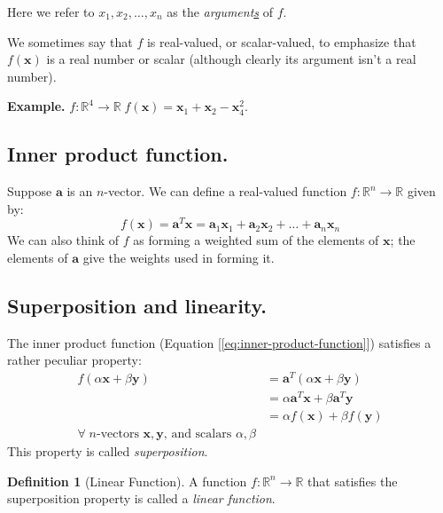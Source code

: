 \documentclass[11pt]{book}
\theoremstyle{definition}
\newtheorem{definition}{Definition}
\theoremstyle{plain}
\theoremstyle{problemstyle}
\theoremstyle{remark}
\theoremstyle{definition}
\begin{document}
Here we refer to $x_1,x_2,\dots,x_n$ as the \emph{argument\underline{s}} of $f$. 

We sometimes say that $f$ is real-valued, or scalar-valued, to emphasize that $f(\boldsymbol{x})$ is a real number or scalar (although clearly its argument isn't a real number).

\textbf{Example.} $f:\mathbb{R}^4\rightarrow\mathbb{R}\;f(\boldsymbol{x})=\boldsymbol{x}_1+\boldsymbol{x}_2-\boldsymbol{x}_4^2$.

\subsection*{Inner product function.}
Suppose $\boldsymbol{a}$ is an $n$-vector. We can define a real-valued function $f:\mathbb{R}^n\rightarrow\mathbb{R}$ given by: 
\begin{equation}
    \label{eq:inner-product-function}
    f(\boldsymbol{x})=\boldsymbol{a}^T\boldsymbol{x}=\boldsymbol{a}_1\boldsymbol{x}_1+\boldsymbol{a}_2\boldsymbol{x}_2+\dots+\boldsymbol{a}_n\boldsymbol{x}_n
\end{equation}
We can also think of $f$ as forming a weighted sum of the elements of $\boldsymbol{x}$; the elements of $\boldsymbol{a}$ give the weights used in forming it.
\subsection*{Superposition and linearity.}
The inner product function (Equation [\ref{eq:inner-product-function}]) satisfies a rather peculiar property:
\begin{equation}
    \label{eq:superposition}
    \begin{aligned}
        f(\alpha\boldsymbol{x}+\beta\boldsymbol{y})&=\boldsymbol{a}^T(\alpha\boldsymbol{x}+\beta\boldsymbol{y})\\
                                                   &=\alpha\boldsymbol{a}^T\boldsymbol{x}+\beta\boldsymbol{a}^T\boldsymbol{y}\\
                                                   &=\alpha f(\boldsymbol{x})+\beta f(\boldsymbol{y})\\
                                                   \text{$\forall\;n$-vectors $\boldsymbol{x,y}$, and scalars $\alpha,\beta$}
    \end{aligned}
\end{equation}
This property is called \emph{superposition}. 

\begin{definition}[Linear Function]
    \label{def:linear-function}
A function $f:\mathbb{R}^n\rightarrow\mathbb{R}$ that satisfies the superposition property is called a \emph{linear function}.
\end{definition}
\end{document}
